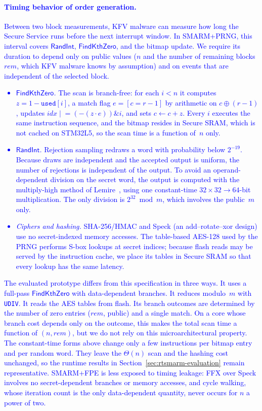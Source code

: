 \documentclass[journal]{IEEEtran}
\newcommand\ben[1]{\textcolor{blue}{#1}}
\newcommand{\rtsmarmone}{SMARM+PRNG\xspace}
\newcommand{\rtsmarmtwo}{SMARM+FPE\xspace}
\begin{document}
\paragraph{\ben{Timing behavior of order generation.}}
\ben{Between two block measurements, KFV malware can measure how long the Secure Service runs before the next interrupt window.
In \rtsmarmone, this interval covers $\mathsf{RandInt}$, $\mathsf{FindKthZero}$, and the bitmap update.
We require its duration to depend only on public values ($n$ and the number of remaining blocks $rem$, which KFV malware knows by assumption) and on events that are independent of the selected block.
\begin{itemize}
  \item \emph{$\mathsf{FindKthZero}$.} The scan is branch-free: for each $i < n$ it computes $z = 1 - \texttt{used}[i]$, a match flag $e = [c = r-1]$ by arithmetic on $c \oplus (r-1)$, updates $idx \mathrel{|}= (-(z \cdot e)) \mathbin{\&} i$, and sets $c \gets c + z$.
  Every $i$ executes the same instruction sequence, and the bitmap resides in Secure SRAM, which is not cached on STM32L5, so the scan time is a function of~$n$ only.
  \item \emph{$\mathsf{RandInt}$.} Rejection sampling redraws a word with probability below $2^{-19}$. Because draws are independent and the accepted output is uniform, the number of rejections is independent of the output.
  To avoid an operand-dependent division on the secret word, the output is computed with the multiply-high method of Lemire~\cite{lemire2019fast}, using one constant-time $32 \times 32 \to 64$-bit multiplication. The only division is $2^{32} \bmod m$, which involves the public~$m$ only.
  \item \emph{Ciphers and hashing.} SHA-256/HMAC and Speck (an add--rotate--xor design) use no secret-indexed memory accesses.
  The table-based AES-128 used by the PRNG performs S-box lookups at secret indices; because flash reads may be served by the instruction cache, we place its tables in Secure SRAM so that every lookup has the same latency.
\end{itemize}
The evaluated prototype differs from this specification in three ways.
It uses a full-pass $\mathsf{FindKthZero}$ with data-dependent branches.
It reduces modulo~$m$ with \texttt{UDIV}.
It reads the AES tables from flash.
Its branch outcomes are determined by the number of zero entries ($rem$, public) and a single match.
On a core whose branch cost depends only on the outcome, this makes the total scan time a function of $(n, rem)$, but we do not rely on this microarchitectural property.
The constant-time forms above change only a few instructions per bitmap entry and per random word.
They leave the $\Theta(n)$ scan and the hashing cost unchanged, so the runtime results in Section~\ref{sec:rtsmarm-evaluation} remain representative.
\rtsmarmtwo is less exposed to timing leakage: FFX over Speck involves no secret-dependent branches or memory accesses, and cycle walking, whose iteration count is the only data-dependent quantity, never occurs for $n$ a power of two.}
\end{document}
